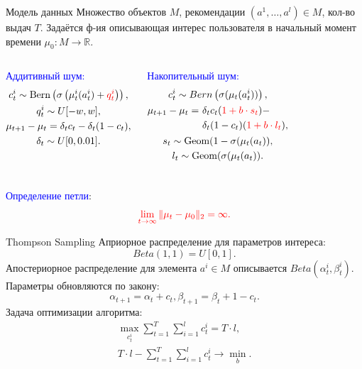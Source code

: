 \documentclass{beamer}
\begin{document}
\begin{frame}{Модель данных}
  Множество объектов $M$, рекомендации $(a^1, \dots, a^l) \in M$, кол-во выдач $T$.
  Задаётся ф-ия описывающая интерес пользователя  в начальный момент времени $\mu_0 : M \to \mathbb{R}$.

\bigskip

\begin{columns}[T]
\textcolor{blue}{Аддитивный шум:}   
\begin{gather*}
    c_t^i \sim \text{Bern} \left(\sigma\left(\mu_t^i (a_t^i) + \mathbin{\color{red} q_t^i } \right) \right), \\ 
    q_t^i \sim U[-w, w], \\
\mu_{t+1} - \mu_{t} = \delta_t c_t - \delta_t (1 - c_t), \\
\delta_t \sim U[0, 0.01].
  \end{gather*}

\textcolor{blue}{Накопительный шум:}   
\begin{gather*}
  c_t^i \sim Bern \left(\sigma(\mu_t(a_t^i)) \right), \\
  \begin{align*}
    \mu_{t+1} - \mu_{t} =~&\delta_t c_t (\mathbin{ \color{red} 1 + b \cdot s_t}) - \\ 
                        &\delta_t (1 - c_t) (\mathbin{ \color{red} 1 + b \cdot l_t}),
\end{align*} \\
  s_t \sim \text{Geom}(1 - \sigma(\mu_t(a_t)), \\
  l_t \sim \text{Geom}(\sigma(\mu_t(a_t)). 
\end{gather*}
\end{columns}
\bigskip
\textcolor{blue}{Определение петли}:
\begin{gather*}
  \color{red} \lim_{t \to \infty} \|\mu_t - \mu_0 \|_2 = \infty.
\end{gather*}
\end{frame}
\begin{frame}{Thompson Sampling}
Априорное распределение для параметров интереса: 
\[Beta(1, 1) = U[0, 1].\] 
Апостериорное распределение для элемента $a^i \in M$ описывается $Beta(\alpha_t^i, \beta_t^i)$. 
Параметры обновляются по закону:
\[\alpha_{t+1} = \alpha_t + c_t, \beta_{t+1} = \beta_t + 1 - c_t.\]
Задача оптимизации алгоритма:
\begin{gather*}  
\max_{c_t^i} \sum_{t = 1}^T \sum_{i = 1}^l c_t^i = T \cdot l,\\ 
   T \cdot l - \sum_{t = 1}^T \sum_{i = 1}^l c_t^i \to \min_{b}. 
\end{gather*}
\end{frame}
\end{document}
